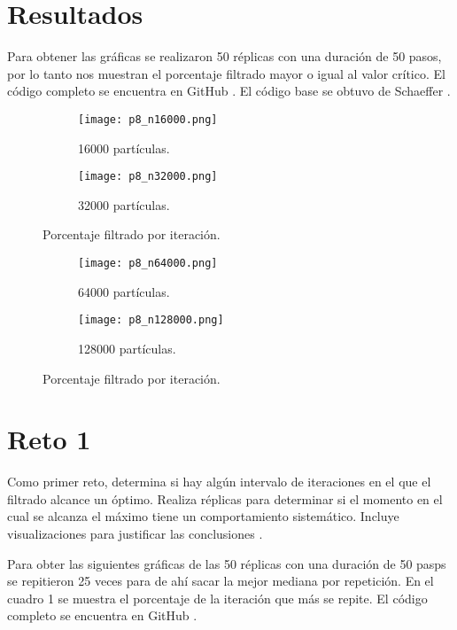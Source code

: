 \documentclass{article}
\begin{document}
\section{Resultados}
Para obtener las gráficas se realizaron 50 réplicas con una duración de 50 pasos, por lo tanto nos muestran el porcentaje filtrado mayor o igual al valor crítico. El código completo se encuentra en GitHub \cite{Denisse_Leyva}. El código base se obtuvo de Schaeffer \cite{Elisa_Schaeffer}.

\begin{figure}[H]
\centering
\begin{subfigure}[b]{0.40\linewidth}
\texttt{[image: p8\_n16000.png]}
\caption{16000 partículas.}
\end{subfigure}
\begin{subfigure}[b]{0.40\linewidth}
\texttt{[image: p8\_n32000.png]}
\caption{32000 partículas.}
\end{subfigure}
\caption{Porcentaje filtrado por iteración.}
\label{fig:westminster}
\end{figure}

\begin{figure}[H]
\centering
\begin{subfigure}[b]{0.40\linewidth}
\texttt{[image: p8\_n64000.png]}
\caption{64000 partículas.}
\end{subfigure}
\begin{subfigure}[b]{0.40\linewidth}
\texttt{[image: p8\_n128000.png]}
\caption{128000 partículas.}
\end{subfigure}
\caption{Porcentaje filtrado por iteración.}
\label{fig:westminster}
\end{figure}

\section{Reto 1}
Como primer reto, determina si hay algún intervalo de iteraciones en el que el filtrado alcance un óptimo. Realiza réplicas para determinar si el momento en el cual se alcanza el máximo tiene un comportamiento sistemático. Incluye visualizaciones para justificar las conclusiones \cite{Satu_Elisa_Schaeffer}.

Para obter las siguientes gráficas de las 50 réplicas con una duración de 50 pasps se repitieron 25 veces para de ahí sacar la mejor mediana por repetición. 
En el cuadro 1 se muestra el porcentaje de la iteración que más se repite. El código completo se encuentra en GitHub \cite{Denisse_Leyva}.
\end{document}
